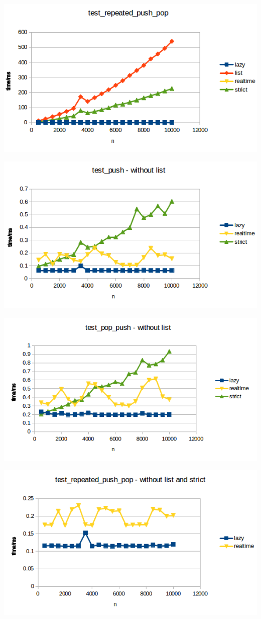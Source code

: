 \includegraphics{Graphs/test_repeated_push_pop.png}


\includegraphics{Graphs/test_push_without_list.png}


\includegraphics{Graphs/test_pop_push_without_list.png}


\includegraphics{Graphs/test_repeated_push_pop_without_list.png}


